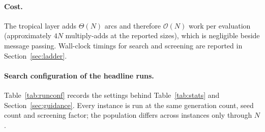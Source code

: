 \documentclass[11pt]{article}
\begin{document}
\paragraph{Cost.} The tropical layer adds $\Theta(N)$ arcs and therefore
$\mathcal{O}(N)$ work per evaluation (approximately $4N$ multiply-adds at the reported
sizes), which is negligible beside message passing. Wall-clock timings for search and
screening are reported in Section~\ref{sec:ladder}.

\paragraph{Search configuration of the headline runs.} Table~\ref{tab:runconf} records the
settings behind Table~\ref{tab:stats} and Section~\ref{sec:guidance}. Every instance is run
at the same generation count, seed count and screening factor; the population differs across
instances only through $N$.
\end{document}
